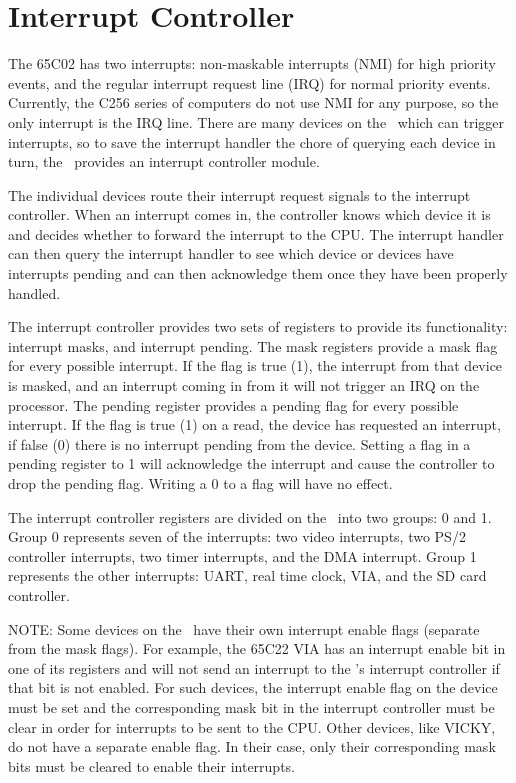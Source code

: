 \chapter{Interrupt Controller}

The 65C02 has two interrupts: non-maskable interrupts (NMI) for high priority events, and the regular interrupt request line (IRQ) for normal priority events. Currently, the C256 series of computers do not use NMI for any purpose, so the only interrupt is the IRQ line. There are many devices on the \jr\ which can trigger interrupts, so to save the interrupt handler the chore of querying each device in turn, the \jr\ provides an interrupt controller module.

The individual devices route their interrupt request signals to the interrupt controller. When an interrupt comes in, the controller knows which device it is and decides whether to forward the interrupt to the CPU. The interrupt handler can then query the interrupt handler to see which device or devices have interrupts pending and can then acknowledge them once they have been properly handled.

The interrupt controller provides two sets of registers to provide its functionality: interrupt masks, and interrupt pending. The mask registers provide a mask flag for every possible interrupt. If the flag is true (1), the interrupt from that device is masked, and an interrupt coming in from it will not trigger an IRQ on the processor. The pending register provides a pending flag for every possible interrupt. If the flag is true (1) on a read, the device has requested an interrupt, if false (0) there is no interrupt pending from the device. Setting a flag in a pending register to 1 will acknowledge the interrupt and cause the controller to drop the pending flag. Writing a 0 to a flag will have no effect.

The interrupt controller registers are divided on the \jr\ into two groups: 0 and 1. Group 0 represents seven of the interrupts: two video interrupts, two PS/2 controller interrupts, two timer interrupts, and the DMA interrupt. Group 1 represents the other interrupts: UART, real time clock, VIA, and the SD card controller.

NOTE: Some devices on the \jr\ have their own interrupt enable flags (separate from the mask flags). For example, the 65C22 VIA has an interrupt enable bit in one of its registers and will not send an interrupt to the \jr's interrupt controller if that bit is not enabled. For such devices, the interrupt enable flag on the device must be set and the corresponding mask bit in the interrupt controller must be clear in order for interrupts to be sent to the CPU. Other devices, like VICKY, do not have a separate enable flag. In their case, only their corresponding mask bits must be cleared to enable their interrupts.

